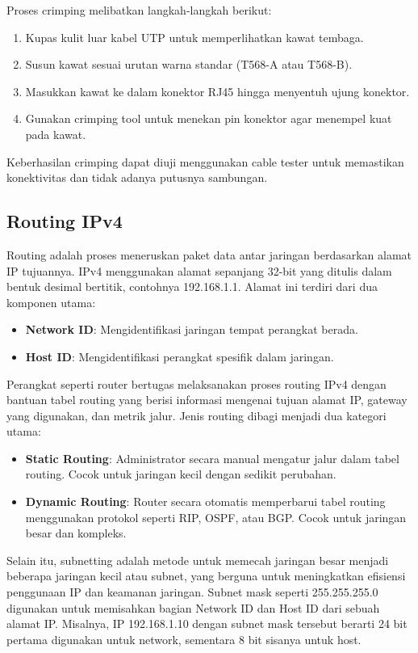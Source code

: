Proses crimping melibatkan langkah-langkah berikut:
\begin{enumerate}
    \item Kupas kulit luar kabel UTP untuk memperlihatkan kawat tembaga.
    \item Susun kawat sesuai urutan warna standar (T568-A atau T568-B).
    \item Masukkan kawat ke dalam konektor RJ45 hingga menyentuh ujung konektor.
    \item Gunakan crimping tool untuk menekan pin konektor agar menempel kuat pada kawat.
\end{enumerate}
Keberhasilan crimping dapat diuji menggunakan cable tester untuk memastikan konektivitas dan tidak adanya putusnya sambungan.

\subsection*{Routing IPv4}
Routing adalah proses meneruskan paket data antar jaringan berdasarkan alamat IP tujuannya. IPv4 menggunakan alamat sepanjang 32-bit yang ditulis dalam bentuk desimal bertitik, contohnya 192.168.1.1. Alamat ini terdiri dari dua komponen utama:
\begin{itemize}
    \item \textbf{Network ID}: Mengidentifikasi jaringan tempat perangkat berada.
    \item \textbf{Host ID}: Mengidentifikasi perangkat spesifik dalam jaringan.
\end{itemize}
Perangkat seperti router bertugas melaksanakan proses routing IPv4 dengan bantuan tabel routing yang berisi informasi mengenai tujuan alamat IP, gateway yang digunakan, dan metrik jalur. Jenis routing dibagi menjadi dua kategori utama:
\begin{itemize}
    \item \textbf{Static Routing}: Administrator secara manual mengatur jalur dalam tabel routing. Cocok untuk jaringan kecil dengan sedikit perubahan.
    \item \textbf{Dynamic Routing}: Router secara otomatis memperbarui tabel routing menggunakan protokol seperti RIP, OSPF, atau BGP. Cocok untuk jaringan besar dan kompleks.
\end{itemize}
Selain itu, subnetting adalah metode untuk memecah jaringan besar menjadi beberapa jaringan kecil atau subnet, yang berguna untuk meningkatkan efisiensi penggunaan IP dan keamanan jaringan. Subnet mask seperti 255.255.255.0 digunakan untuk memisahkan bagian Network ID dan Host ID dari sebuah alamat IP. Misalnya, IP 192.168.1.10 dengan subnet mask tersebut berarti 24 bit pertama digunakan untuk network, sementara 8 bit sisanya untuk host.

